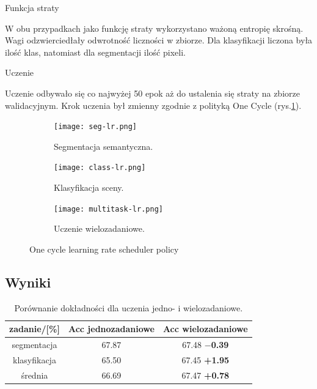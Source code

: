 \noindent
Funkcja straty

W obu przypadkach jako funkcję straty wykorzystano ważoną entropię skrośną. Wagi odzwierciedłały odwrotność liczności w zbiorze. Dla klasyfikacji liczona była ilość klas, natomiast dla segmentacji ilość pixeli.

\noindent
Uczenie

Uczenie odbywało się co najwyżej 50 epok aż do ustalenia się straty na zbiorze walidacyjnym. Krok uczenia był zmienny zgodnie z polityką One Cycle (rys.\ref{fig:one-cycle-policy}).


\begin{figure}[ht!]
    \centering
    \begin{subfigure}[b]{0.32\textwidth}
        \centering
        \texttt{[image: seg-lr.png]}
        \caption{Segmentacja semantyczna.}
    \end{subfigure}
    \hfill
    \begin{subfigure}[b]{0.32\textwidth}
        \centering
        \texttt{[image: class-lr.png]}
        \caption{Klasyfikacja sceny.}
    \end{subfigure}
    \hfill
    \begin{subfigure}[b]{0.32\textwidth}
        \centering
        \texttt{[image: multitask-lr.png]}
        \caption{Uczenie wielozadaniowe.}
    \end{subfigure}
    \caption[]{One cycle learning rate scheduler policy}
    \label{fig:one-cycle-policy}
\end{figure}
\subsection{Wyniki}

\begin{table}[]
    \centering
    \begin{tabular}{c|cc}
        zadanie/{[}\%{]} & Acc jednozadaniowe & Acc wielozadaniowe \\ \hline
        segmentacja      & 67.87               & 67.48  \footnotesize{\textbf{$-$0.39}}        \\
        klasyfikacja     & 65.50               & 67.45  \footnotesize{\textbf{+1.95}}        \\ \hline
    średnia          & 66.69               & 67.47  \footnotesize{\textbf{+0.78}}       
\end{tabular}
\caption{Porównanie dokładności dla uczenia jedno- i wielozadaniowe.}
\label{tab:acc-por}
\end{table}

